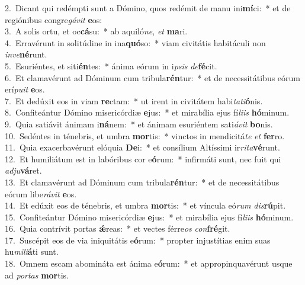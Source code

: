 {2.~}Dicant qui redémpti sunt a Dómino, quos redémit de manu ini\textbf{mí}ci:~* et de regiónibus congre\textit{gá}\textit{vit} \textbf{e}os:\\
{3.~}A solis ortu, et oc\textbf{cá}su:~* ab aquiló\textit{ne}, \textit{et} \textbf{ma}ri.\\
{4.~}Erravérunt in solitúdine in ina\textbf{quó}so:~* viam civitátis habitáculi non \textit{in}\textit{ve}\textbf{né}runt.\\
{5.~}Esuriéntes, et siti\textbf{én}tes:~* ánima eórum in i\textit{psis} \textit{de}\textbf{fé}cit.\\
{6.~}Et clamavérunt ad Dóminum cum tribula\textbf{rén}tur:~* et de necessitátibus eórum erí\textit{pu}\textit{it} \textbf{e}os.\\
{7.~}Et dedúxit eos in viam \textbf{re}ctam:~* ut irent in civitátem habi\textit{ta}\textit{ti}\textbf{ó}nis.\\
{8.~}Confiteántur Dómino misericórdiæ \textbf{e}jus:~* et mirabília ejus fí\textit{li}\textit{is} \textbf{hó}minum.\\
{9.~}Quia satiávit ánimam i\textbf{ná}nem:~* et ánimam esuriéntem sati\textit{á}\textit{vit} \textbf{bo}nis.\\
{10.~}Sedéntes in ténebris, et umbra \textbf{mor}tis:~* vinctos in mendicitá\textit{te} \textit{et} \textbf{fer}ro.\\
{11.~}Quia exacerbavérunt elóquia \textbf{De}i:~* et consílium Altíssimi ir\textit{ri}\textit{ta}\textbf{vé}runt.\\
{12.~}Et humiliátum est in labóribus cor e\textbf{ó}rum:~* infirmáti sunt, nec fuit qui \textit{ad}\textit{ju}\textbf{vá}ret.\\
{13.~}Et clamavérunt ad Dóminum cum tribula\textbf{rén}tur:~* et de necessitátibus eórum libe\textit{rá}\textit{vit} \textbf{e}os.\\
{14.~}Et edúxit eos de ténebris, et umbra \textbf{mor}tis:~* et víncula eó\textit{rum} \textit{dis}\textbf{rú}pit.\\
{15.~}Confiteántur Dómino misericórdiæ \textbf{e}jus:~* et mirabília ejus fí\textit{li}\textit{is} \textbf{hó}minum.\\
{16.~}Quia contrívit portas \textbf{ǽ}reas:~* et vectes férre\textit{os} \textit{con}\textbf{fré}git.\\
{17.~}Suscépit eos de via iniquitátis e\textbf{ó}rum:~* propter injustítias enim suas hu\textit{mi}\textit{li}\textbf{á}ti sunt.\\
{18.~}Omnem escam abomináta est ánima e\textbf{ó}rum:~* et appropinquavérunt usque ad \textit{por}\textit{tas} \textbf{mor}tis.\\
